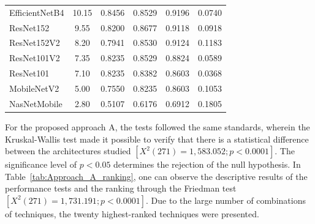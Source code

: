\documentclass[preprint,12pt]{elsarticle}
\begin{document}
\begin{table}[h!]
{\begin{tabular}{|l|c|c|c|c|c|}
			EfficientNetB4 & 10.15 & 0.8456 & 0.8529 & 0.9196 & 0.0740 \\
			ResNet152 & 9.55 & 0.8200 & 0.8677 & 0.9118 & 0.0918 \\
			ResNet152V2 & 8.20 & 0.7941 & 0.8530 & 0.9124 & 0.1183 \\
			ResNet101V2 & 7.35 & 0.8235 & 0.8529 & 0.8824 & 0.0589 \\
			ResNet101 & 7.10 & 0.8235 & 0.8382 & 0.8603 & 0.0368 \\
			MobileNetV2 & 5.00 & 0.7550 & 0.8235 & 0.8603 & 0.1053 \\
			NasNetMobile & 2.80 & 0.5107 & 0.6176 & 0.6912 & 0.1805 \\
			\hline
		\end{tabular}
	}
\end{table}

For the proposed approach A, the tests followed the same standards, wherein the Kruskal-Wallis test made it possible to verify that there is a statistical difference between the architectures studied $[X^2(271)=1,583.052; p<0.0001]$. The significance level of $p<0.05$ determines the rejection of the null hypothesis. In Table~\ref{tab:Approach_A_ranking}, one can observe the descriptive results of the performance tests and the ranking through the Friedman test $[X^2(271)=1,731.191; p<0.0001]$. Due to the large number of combinations of techniques, the twenty highest-ranked techniques were presented.
\end{document}
